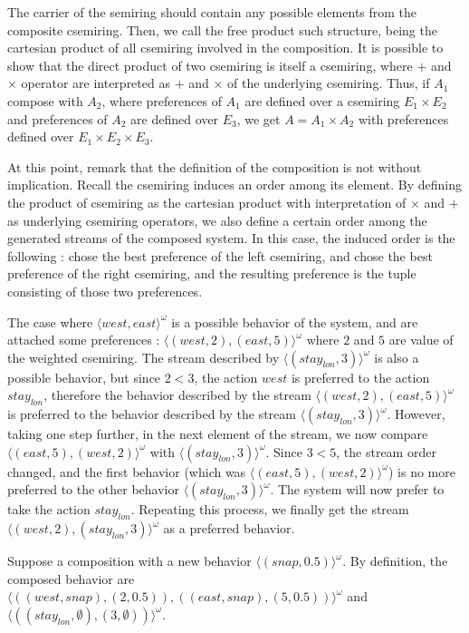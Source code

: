The carrier of the semiring should contain any possible elements from the composite csemiring. Then, we call the free product such structure, being the cartesian product of all csemiring involved in the composition. It is possible to show that the direct product of two csemiring is itself a csemiring, where $+$ and $\times$ operator are interpreted as $+$ and $\times$ of the underlying csemiring. Thus, if $A_1$ compose with $A_2$, where preferences of $A_1$ are defined over a csemiring $E_1 \times E_2$ and preferences of $A_2$ are defined over $E_3$, we get $A = A_1 \times A_2$ with preferences defined over $E_1 \times E_2 \times E_3$.

At this point, remark that the definition of the composition is not without implication. Recall the csemiring induces an order among its element. By defining the product of csemiring as the cartesian product with interpretation of $\times$ and $+$ as underlying csemiring operators, we also define a certain order among the generated streams of the composed system. In this case, the induced order is the following : chose the best preference of the left csemiring, and chose the best preference of the right csemiring, and the resulting preference is the tuple consisting of those two preferences. 

\begin{example}
	The case where $\langle west, east \rangle ^{\omega}$ is a possible behavior of the system, and are attached some preferences : $\langle (west ,2), (east,5) \rangle ^{\omega}$ where $2$ and $5$ are value of the weighted csemiring. The stream described by $\langle (stay_{lon} ,3) \rangle ^{\omega}$ is also a possible behavior, but since $2<3$, the action $west$ is preferred to the action $stay_{lon}$, therefore the behavior described by the stream $\langle (west ,2), (east,5) \rangle ^{\omega}$ is preferred to the behavior described by the stream $\langle (stay_{lon} ,3) \rangle ^{\omega}$. However, taking one step further, in the next element of the stream, we now compare $\langle (east,5),(west ,2) \rangle ^{\omega}$ with $\langle (stay_{lon} ,3) \rangle ^{\omega}$. Since $3<5$, the stream order changed, and the first behavior (which was $\langle (east,5),(west ,2) \rangle ^{\omega}$) is no more preferred to the other behavior  $\langle (stay_{lon} ,3) \rangle ^{\omega}$. The system will now prefer to take the action $stay_{lon}$. Repeating this process, we finally get the stream $\langle (west,2),(stay_{lon},3) \rangle ^{\omega}$ as a preferred behavior.
\end{example}

\begin{example}
	Suppose a composition with a new behavior $\langle (snap,0.5) \rangle ^{\omega}$. By definition, the composed behavior are $\langle ((west,snap),(2,0.5)),((east,snap),(5,0.5)) \rangle ^{\omega}$ and $\langle ((stay_{lon},\emptyset),(3,\emptyset)) \rangle ^{\omega}$.
\end{example}


